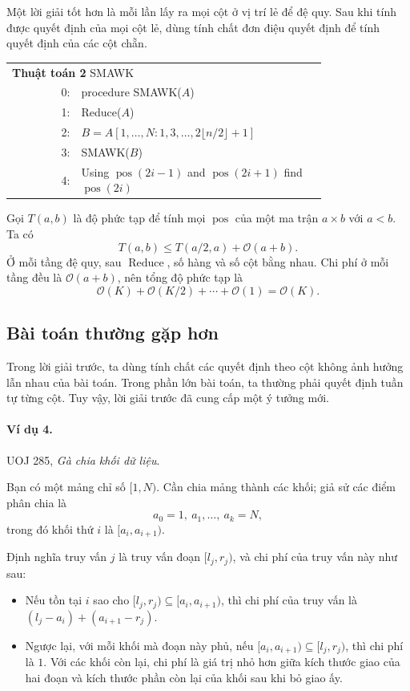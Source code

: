 \documentclass[11pt]{article}
\newcommand{\Oh}{\mathcal{O}}
\begin{document}
Một lời giải tốt hơn là mỗi lần lấy ra mọi cột ở vị trí lẻ để đệ quy. Sau khi
tính được quyết định của mọi cột lẻ, dùng tính chất đơn điệu quyết định để
tính quyết định của các cột chẵn.

\begin{center}
\small
\begin{tabular}{r@{\quad}p{0.78\linewidth}}
\multicolumn{2}{l}{\textbf{Thuật toán 2} SMAWK}\\
0: & procedure SMAWK(\(A\))\\
1: & \quad Reduce(\(A\))\\
2: & \quad \(B=A[1,\ldots,N:1,3,\ldots,2\lfloor n/2\rfloor+1]\)\\
3: & \quad SMAWK(\(B\))\\
4: & \quad Using \(\operatorname{pos}(2i-1)\) and
\(\operatorname{pos}(2i+1)\) find \(\operatorname{pos}(2i)\)
\end{tabular}
\end{center}

Gọi \(T(a,b)\) là độ phức tạp để tính mọi \(\operatorname{pos}\) của một ma
trận \(a\times b\) với \(a<b\). Ta có
\[
  T(a,b)\le T(a/2,a)+\Oh(a+b).
\]
Ở mỗi tầng đệ quy, sau \(\operatorname{Reduce}\), số hàng và số cột bằng nhau.
Chi phí ở mỗi tầng đều là \(\Oh(a+b)\), nên tổng độ phức tạp là
\[
  \Oh(K)+\Oh(K/2)+\cdots+\Oh(1)=\Oh(K).
\]

\subsection{Bài toán thường gặp hơn}

Trong lời giải trước, ta dùng tính chất các quyết định theo cột không ảnh
hưởng lẫn nhau của bài toán. Trong phần lớn bài toán, ta thường phải quyết
định tuần tự từng cột. Tuy vậy, lời giải trước đã cung cấp một ý tưởng mới.

\paragraph{Ví dụ 4.}
UOJ 285, \emph{Gà chia khối dữ liệu}.

Bạn có một mảng chỉ số \([1,N)\). Cần chia mảng thành các khối; giả sử các
điểm phân chia là
\[
  a_0=1,\ a_1,\ldots,\ a_k=N,
\]
trong đó khối thứ \(i\) là \([a_i,a_{i+1})\).

Định nghĩa truy vấn \(j\) là truy vấn đoạn \([l_j,r_j)\), và chi phí của truy
vấn này như sau:
\begin{itemize}
  \item Nếu tồn tại \(i\) sao cho
  \([l_j,r_j)\subseteq[a_i,a_{i+1})\), thì chi phí của truy vấn là
  \((l_j-a_i)+(a_{i+1}-r_j)\).

  \item Ngược lại, với mỗi khối mà đoạn này phủ, nếu
  \([a_i,a_{i+1})\subseteq[l_j,r_j)\), thì chi phí là \(1\). Với các khối còn
  lại, chi phí là giá trị nhỏ hơn giữa kích thước giao của hai đoạn và kích
  thước phần còn lại của khối sau khi bỏ giao ấy.
\end{itemize}
\end{document}
